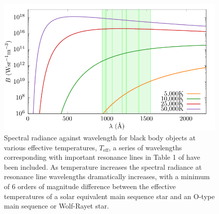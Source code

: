 \begin{figure}
  \centering
  \includegraphics{assets/plancks-law/plancks-law.pdf}
  \caption[Planck's law radiance comparison with resonance lines]{Spectral radiance against wavelength for black body objects at various effective temperatures, $T_{\text{eff}}$, a series of wavelengths corresponding with important resonance lines in Table 1 of \textcite{lucy_mass_1970} have been included. As temperature increases the spectral radiance at resonance line wavelengths dramatically increases, with a minimum of 6 orders of magnitude difference between the effective temperatures of a solar equivalent main sequence star and an O-type main sequence or Wolf-Rayet star.}
  \label{fig:planck-comp}
\end{figure}


